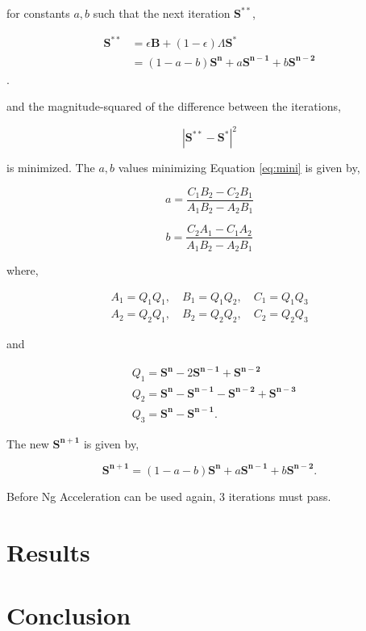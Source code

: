 \documentclass[12pt]{article}
\begin{document}
for constants $a,b$ such that the next iteration $\mathbf{S^{**}}$,

\begin{equation}
\begin{split}
    \mathbf{S^{**}} &= \epsilon \mathbf{B} +(1-\epsilon)\Lambda \mathbf{S^{*}}\\
    & = (1-a-b)\mathbf{S^{n}} + a\mathbf{S^{n-1}} + b\mathbf{S^{n-2}}
\end{split}
\end{equation}. 

and the magnitude-squared of the difference between the iterations,

\begin{equation}\label{eq:mini}
    | \mathbf{S^{**}} - \mathbf{S^{*}}|^{2} 
\end{equation}

is minimized. The $a,b$ values minimizing Equation \ref{eq:mini} is given by,

\begin{equation}
    a = \frac{C_{1}B_{2}-C_{2}B_{1}}{A_{1}B_{2}-A_{2}B_{1}}
\end{equation}

\begin{equation}
    b = \frac{C_{2}A_{1} - C_{1}A_{2}}{A_{1}B_{2}-A_{2}B_{1}}
\end{equation}

where,

\begin{equation}
\begin{split}
    A_{1} = Q_{1}Q_{1},\quad B_{1}=Q_{1}Q_{2},\quad C_{1}=Q_{1}Q_{3}\\
    A_{2} = Q_{2}Q_{1},\quad B_{2}=Q_{2}Q_{2},\quad C_{2}=Q_{2}Q_{3}
\end{split}
\end{equation}

and 

\begin{equation}
    \begin{split}
        & Q_{1} = \mathbf{S^{n}}-2\mathbf{S^{n-1}}+\mathbf{S^{n-2}}\\
        & Q_{2} = \mathbf{S^{n}}-\mathbf{S^{n-1}}-\mathbf{S^{n-2}}+\mathbf{S^{n-3}}\\
        & Q_{3} = \mathbf{S^{n}}-\mathbf{S^{n-1}}.
    \end{split}
\end{equation}

The new $\mathbf{S^{n+1}}$ is given by,

\begin{equation}
    \mathbf{S^{n+1}} = (1-a-b)\mathbf{S^{n}} + a\mathbf{S^{n-1}} + b\mathbf{S^{n-2}}.
\end{equation}

Before Ng Acceleration can be used again, 3 iterations must pass.


\section{Results}



\section{Conclusion}




\end{document}
